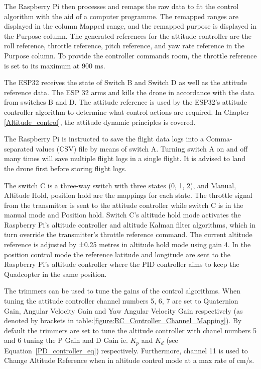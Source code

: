 \documentclass{article}
\begin{document}
The Raspberry Pi then processes and remaps the raw data to fit the control
algorithm with the aid of a computer programme. The remapped ranges are
displayed in the column Mapped range, and the remapped purpose is displayed in
the Purpose column. The generated references for the attitude controller are the
roll reference, throttle reference, pitch reference, and yaw rate reference in
the Purpose column. To provide the controller commands room, the throttle
reference is set to its maximum at 900 ms.

The ESP32 receives the state of Switch B and Switch D as well as the attitude
reference data. The ESP 32  arms and kills the drone in accordance with the data
from switches B and D. The attitude reference is used by the ESP32's attitude
controller algorithm to determine what control actions are required. In Chapter
\ref{Altitude_control}, the attitude dynamic principles is covered. 

The Raspberry Pi is instructed to save the flight data logs into a
Comma-separated values (CSV) file by means of switch A. Turning switch A on and
off many times will save multiple flight logs in a single flight. It is advised
to land the drone first before storing flight logs.

The switch C is a three-way switch with three states ({0, 1, 2}), and {Manual,
Altitude Hold, position hold} are the mappings for each state. The throttle
signal from the transmitter is sent to the attitude controller while switch C is
in the manual mode and Position hold. Switch C's altitude hold mode activates
the Raspberry Pi's altitude controller and altitude Kalman filter algorithms,
which in turn override the transmitter's throttle reference command. The current
altitude reference is adjusted by ±0.25 metres in altitude hold mode using gain
4. In the position control mode the reference latitude and longitude are
sent to the Raspberry Pi's altitude controller where the PID controller aims to
keep the Quadcopter in the same position.

The trimmers can be used to tune the gains of the control algorithms. When
tuning the attitude controller channel numbers 5, 6, 7 are set to Quaternion
Gain, Angular Velocity Gain and Yaw Angular Velocity Gain respectively (as
denoted by brackets in table:\ref{figure:RC_Controller_Channel_Mapping}). By
default the trimmers are set to tune the altitude controller with chanel numbers
5 and 6 tuning the P Gain and D Gain ie. $K_{p}$ and ${K}_{d}$ (see
Equation~\ref{PD_controller_eq}) respectively. Furthermore, channel 11 is used
to Change Altitude Reference when in altitude control mode at a max rate of
\unit[4]{cm/s}. 
\end{document}
